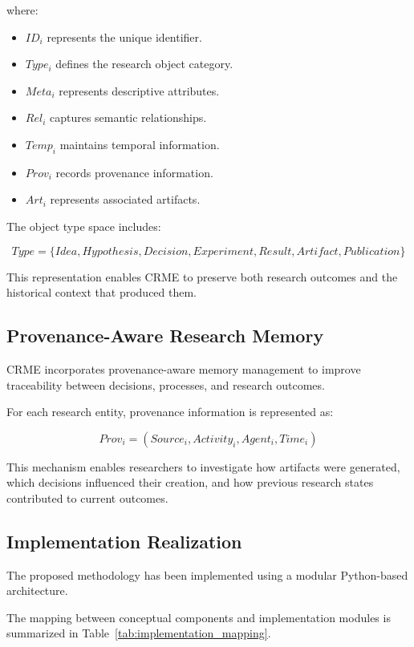 where:

\begin{itemize}
\item $ID_i$ represents the unique identifier.
\item $Type_i$ defines the research object category.
\item $Meta_i$ represents descriptive attributes.
\item $Rel_i$ captures semantic relationships.
\item $Temp_i$ maintains temporal information.
\item $Prov_i$ records provenance information.
\item $Art_i$ represents associated artifacts.
\end{itemize}

The object type space includes:

\[
Type =
\{Idea,Hypothesis,Decision,Experiment,Result,Artifact,Publication\}
\]

This representation enables CRME to preserve both research outcomes and the historical context that produced them.


\subsection{Provenance-Aware Research Memory}

CRME incorporates provenance-aware memory management to improve traceability between decisions, processes, and research outcomes.

For each research entity, provenance information is represented as:

\[
Prov_i =
(Source_i,Activity_i,Agent_i,Time_i)
\]

This mechanism enables researchers to investigate how artifacts were generated, which decisions influenced their creation, and how previous research states contributed to current outcomes.


\subsection{Implementation Realization}

The proposed methodology has been implemented using a modular Python-based architecture.

The mapping between conceptual components and implementation modules is summarized in Table~\ref{tab:implementation_mapping}.

